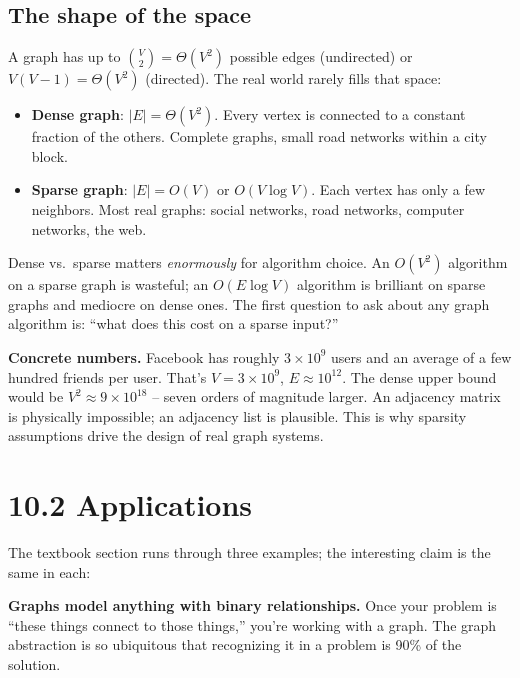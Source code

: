 \documentclass[11pt]{article}
\begin{document}
\subsection*{The shape of the space}

A graph has up to $\binom{V}{2} = \Theta(V^2)$ possible edges (undirected) or $V(V-1) = \Theta(V^2)$ (directed). The real world rarely fills that space:

\begin{itemize}[leftmargin=*]
    \item \textbf{Dense graph}: $|E| = \Theta(V^2)$. Every vertex is connected to a constant fraction of the others. Complete graphs, small road networks within a city block.
    \item \textbf{Sparse graph}: $|E| = O(V)$ or $O(V \log V)$. Each vertex has only a few neighbors. Most real graphs: social networks, road networks, computer networks, the web.
\end{itemize}

Dense vs.\ sparse matters \emph{enormously} for algorithm choice. An $O(V^2)$ algorithm on a sparse graph is wasteful; an $O(E \log V)$ algorithm is brilliant on sparse graphs and mediocre on dense ones. The first question to ask about any graph algorithm is: ``what does this cost on a sparse input?''

\begin{examplebox}
\textbf{Concrete numbers.} Facebook has roughly $3 \times 10^9$ users and an average of a few hundred friends per user. That's $V = 3 \times 10^9$, $E \approx 10^{12}$. The dense upper bound would be $V^2 \approx 9 \times 10^{18}$ -- seven orders of magnitude larger. An adjacency matrix is physically impossible; an adjacency list is plausible. This is why sparsity assumptions drive the design of real graph systems.
\end{examplebox}

\section{10.2 Applications}

The textbook section runs through three examples; the interesting claim is the same in each:

\begin{ideabox}
\textbf{Graphs model anything with binary relationships.} Once your problem is ``these things connect to those things,'' you're working with a graph. The graph abstraction is so ubiquitous that recognizing it in a problem is 90\% of the solution.
\end{ideabox}
\end{document}
